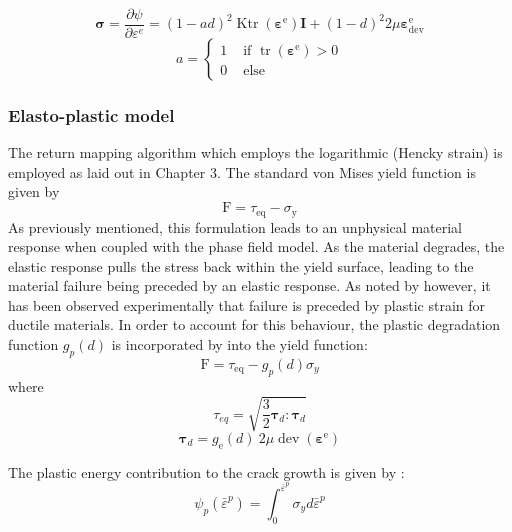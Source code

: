 \documentclass[sn-mathphys,Numbered,draft]{sn-jnl}%
\begin{document}
\begin{equation}
\boldsymbol{\sigma}=\frac{\partial \psi}{\partial \varepsilon^e}=(1-a d)^2 \operatorname{Ktr}\left(\boldsymbol{\varepsilon}^{\mathrm{e}}\right) \mathbf{I}+(1-d)^2 2 \mu \boldsymbol{\varepsilon}_{\mathrm{dev}}^{\mathrm{e}}
\end{equation}
\begin{equation}
a= \begin{cases}1 & \text { if } \operatorname{tr}\left(\boldsymbol{\varepsilon}^{\mathrm{e}}\right)>0 \\ 0 & \text { else } \end{cases}
\end{equation}



\subsubsection{Elasto-plastic model}

The return mapping algorithm which employs the logarithmic (Hencky strain) is employed as laid out in Chapter 3. The standard von Mises yield function is given by
\begin{equation}
\mathrm{F}=\tau_{\mathrm{eq}}-\sigma_{\mathrm{y}}
\end{equation}
As previously mentioned, this formulation leads to an unphysical material response when coupled with the phase field model. As the material degrades, the elastic response pulls the stress back within the yield surface, leading to the material failure being preceded by an elastic response. As noted by \citet{borden_phase-field_2016} however, it has been observed experimentally that failure is preceded by plastic strain for ductile materials. In order to account for this behaviour, the plastic degradation function $g_p(d)$ is incorporated by \citet{borden_phase-field_2016} into the yield function:
\begin{equation}
\mathrm{F}=\tau_{\mathrm{eq}}-g_p(d)\sigma_y
\end{equation}
where 
\begin{equation}
\tau_{eq}=\sqrt{\frac{3}{2} \boldsymbol{\tau}_d:\boldsymbol{\tau}_d}
\end{equation}
\begin{equation}
\boldsymbol{\tau}_d=g_{\mathrm{e}}(d)\ 2 \mu \operatorname{dev}\left(\boldsymbol{\varepsilon}^{\mathrm{e}}\right)
\end{equation}

The plastic energy contribution to the crack growth is given by \cite{eldahshan_3d_2022}:
\begin{equation}
\psi_p({\bar{\varepsilon}}^p)=\int_0^{\bar{\varepsilon}^p} \sigma_y d \bar{\varepsilon}^p
\end{equation}
\end{document}
